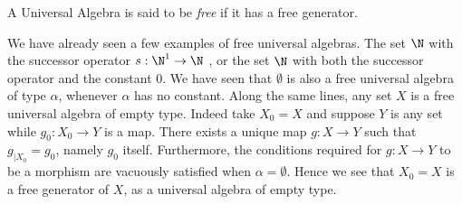\begin{defin}\label{logic:def:free:universal:algebra} A Universal Algebra is said
to be {\em free}  if it has a free generator. \end{defin} We have already seen a
few examples of free universal algebras. The set $\N$ with the successor operator
$s:\N^{1}\to\N$ , or the set $\N$ with both the successor operator and the
constant $0$. We have seen that $\emptyset$ is also a free universal algebra of
type $\alpha$, whenever $\alpha$ has no constant. Along the same lines, any set
$X$ is a free universal algebra of empty type. Indeed take $X_{0}=X$ and suppose
$Y$ is any set while $g_{0}:X_{0}\to Y$ is a map. There exists a unique map
$g:X\to Y$ such that $g_{|X_{0}}=g_{0}$, namely $g_{0}$ itself. Furthermore, the
conditions required for $g:X\to Y$ to be a morphism are vacuously satisfied when
$\alpha=\emptyset$. Hence we see that $X_{0}=X$ is a free generator of $X$, as a
universal algebra of empty type.

